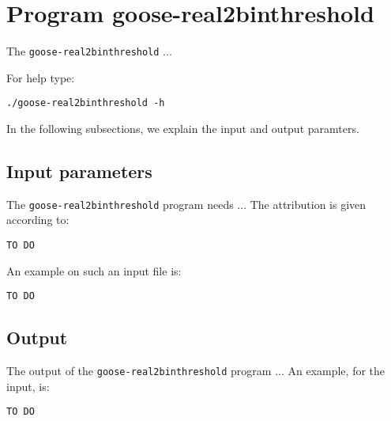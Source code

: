 \section{Program goose-real2binthreshold}
The \texttt{goose-real2binthreshold} ...

For help type:
\begin{lstlisting}
./goose-real2binthreshold -h
\end{lstlisting}
In the following subsections, we explain the input and output paramters.

\subsection*{Input parameters}

The \texttt{goose-real2binthreshold} program needs ...
The attribution is given according to:
\begin{lstlisting}
TO DO
\end{lstlisting}

An example on such an input file is:
\begin{lstlisting}
TO DO
\end{lstlisting}

\subsection*{Output}
The output of the \texttt{goose-real2binthreshold} program ...
An example, for the input, is:
\begin{lstlisting}
TO DO
\end{lstlisting}
